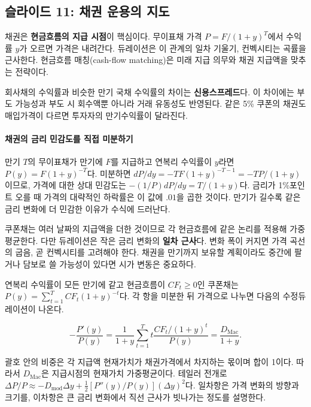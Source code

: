 \documentclass[11pt,a4paper]{article}
\begin{document}
\subsection{슬라이드 11: 채권 운용의 지도}

채권은 \textbf{현금흐름의 지급 시점}이 핵심이다. 무이표채 가격 $P=F/(1+y)^T$에서 수익률 $y$가 오르면 가격은 내려간다. 듀레이션은 이 관계의 일차 기울기, 컨벡시티는 곡률을 근사한다. 현금흐름 매칭(cash-flow matching)은 미래 지급 의무와 채권 지급액을 맞추는 전략이다.
\par

회사채의 수익률과 비슷한 만기 국채 수익률의 차이는 \textbf{신용스프레드}다. 이 차이에는 부도 가능성과 부도 시 회수액뿐 아니라 거래 유동성도 반영된다. 같은 5\% 쿠폰의 채권도 매입가격이 다르면 투자자의 만기수익률이 달라진다.
\par

\paragraph{채권의 금리 민감도를 직접 미분하기}

만기 $T$의 무이표채가 만기에 $F$를 지급하고 연복리 수익률이 $y$라면 $P(y)=F(1+y)^{-T}$다. 미분하면 $dP/dy=-TF(1+y)^{-T-1}=-TP/(1+y)$이므로, 가격에 대한 상대 민감도는 $-(1/P)dP/dy=T/(1+y)$다. 금리가 1\%포인트 오를 때 가격의 대략적인 하락률은 이 값에 $.01$을 곱한 것이다. 만기가 길수록 같은 금리 변화에 더 민감한 이유가 수식에 드러난다.
\par

쿠폰채는 여러 날짜의 지급액을 더한 것이므로 각 현금흐름에 같은 논리를 적용해 가중평균한다. 다만 듀레이션은 작은 금리 변화의 \textbf{일차 근사}다. 변화 폭이 커지면 가격 곡선의 굽음, 곧 컨벡시티를 고려해야 한다. 채권을 만기까지 보유할 계획이라도 중간에 팔거나 담보로 쓸 가능성이 있다면 시가 변동은 중요하다.
\par

연복리 수익률이 모든 만기에 같고 현금흐름이 $CF_t\ge0$인 쿠폰채는 $P(y)=\sum_{t=1}^T CF_t(1+y)^{-t}$다. 각 항을 미분한 뒤 가격으로 나누면 다음의 수정듀레이션이 나온다.
\par

\[
-\frac{P'(y)}{P(y)}=\frac{1}{1+y}\sum_{t=1}^T t\frac{CF_t/(1+y)^t}{P(y)}
=\frac{D_{\mathrm{Mac}}}{1+y}.
\]

괄호 안의 비중은 각 지급액 현재가치가 채권가격에서 차지하는 몫이며 합이 1이다. 따라서 $D_{\mathrm{Mac}}$은 지급시점의 현재가치 가중평균이다. 테일러 전개로 $\Delta P/P\approx-D_{\mathrm{mod}}\Delta y+\tfrac12[P''(y)/P(y)](\Delta y)^2$다. 일차항은 가격 변화의 방향과 크기를, 이차항은 큰 금리 변화에서 직선 근사가 빗나가는 정도를 설명한다.
\par
\end{document}
